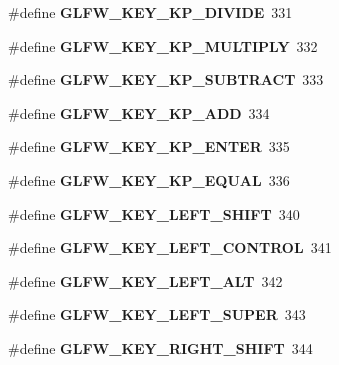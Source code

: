 \begin{DoxyCompactItemize}
\#define {\bfseries G\+L\+F\+W\+\_\+\+K\+E\+Y\+\_\+\+K\+P\+\_\+\+D\+I\+V\+I\+DE}~331
\item 
\mbox{\label{group__keys_ga9ada267eb0e78ed2ada8701dd24a56ef}} 
\#define {\bfseries G\+L\+F\+W\+\_\+\+K\+E\+Y\+\_\+\+K\+P\+\_\+\+M\+U\+L\+T\+I\+P\+LY}~332
\item 
\mbox{\label{group__keys_gaa3dbd60782ff93d6082a124bce1fa236}} 
\#define {\bfseries G\+L\+F\+W\+\_\+\+K\+E\+Y\+\_\+\+K\+P\+\_\+\+S\+U\+B\+T\+R\+A\+CT}~333
\item 
\mbox{\label{group__keys_gad09c7c98acc79e89aa6a0a91275becac}} 
\#define {\bfseries G\+L\+F\+W\+\_\+\+K\+E\+Y\+\_\+\+K\+P\+\_\+\+A\+DD}~334
\item 
\mbox{\label{group__keys_ga4f728f8738f2986bd63eedd3d412e8cf}} 
\#define {\bfseries G\+L\+F\+W\+\_\+\+K\+E\+Y\+\_\+\+K\+P\+\_\+\+E\+N\+T\+ER}~335
\item 
\mbox{\label{group__keys_gaebdc76d4a808191e6d21b7e4ad2acd97}} 
\#define {\bfseries G\+L\+F\+W\+\_\+\+K\+E\+Y\+\_\+\+K\+P\+\_\+\+E\+Q\+U\+AL}~336
\item 
\mbox{\label{group__keys_ga8a530a28a65c44ab5d00b759b756d3f6}} 
\#define {\bfseries G\+L\+F\+W\+\_\+\+K\+E\+Y\+\_\+\+L\+E\+F\+T\+\_\+\+S\+H\+I\+FT}~340
\item 
\mbox{\label{group__keys_ga9f97b743e81460ac4b2deddecd10a464}} 
\#define {\bfseries G\+L\+F\+W\+\_\+\+K\+E\+Y\+\_\+\+L\+E\+F\+T\+\_\+\+C\+O\+N\+T\+R\+OL}~341
\item 
\mbox{\label{group__keys_ga7f27dabf63a7789daa31e1c96790219b}} 
\#define {\bfseries G\+L\+F\+W\+\_\+\+K\+E\+Y\+\_\+\+L\+E\+F\+T\+\_\+\+A\+LT}~342
\item 
\mbox{\label{group__keys_gafb1207c91997fc295afd1835fbc5641a}} 
\#define {\bfseries G\+L\+F\+W\+\_\+\+K\+E\+Y\+\_\+\+L\+E\+F\+T\+\_\+\+S\+U\+P\+ER}~343
\item 
\mbox{\label{group__keys_gaffca36b99c9dce1a19cb9befbadce691}} 
\#define {\bfseries G\+L\+F\+W\+\_\+\+K\+E\+Y\+\_\+\+R\+I\+G\+H\+T\+\_\+\+S\+H\+I\+FT}~344

\end{DoxyCompactItemize}
